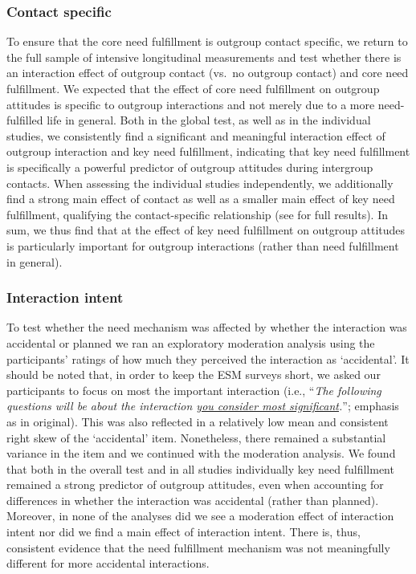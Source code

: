 \subsubsection{Contact specific}

To ensure that the core need fulfillment is outgroup contact specific,
we return to the full sample of intensive longitudinal measurements and
test whether there is an interaction effect of outgroup contact (vs.~no
outgroup contact) and core need fulfillment. We expected that the effect
of core need fulfillment on outgroup attitudes is specific to outgroup
interactions and not merely due to a more need-fulfilled life in
general. Both in the global test, as well as in the individual studies,
we consistently find a significant and meaningful interaction effect of
outgroup interaction and key need fulfillment, indicating that key need
fulfillment is specifically a powerful predictor of outgroup attitudes
during intergroup contacts. When assessing the individual studies
independently, we additionally find a strong main effect of contact as
well as a smaller main effect of key need fulfillment, qualifying the
contact-specific relationship (see  for
full results). In sum, we thus find that at the effect of key need
fulfillment on outgroup attitudes is particularly important for outgroup
interactions (rather than need fulfillment in general).

\subsubsection{Interaction intent}

To test whether the need mechanism was affected by whether the
interaction was accidental or planned we ran an exploratory moderation
analysis using the participants' ratings of how much they perceived the
interaction as `accidental'. It should be noted that, in order to keep
the ESM surveys short, we asked our participants to focus on most the
important interaction (i.e.,
``\textit{The following questions will be about the interaction \underline{you consider most significant}.}'';
emphasis as in original). This was also reflected in a relatively low
mean and consistent right skew of the `accidental' item. Nonetheless,
there remained a substantial variance in the item and we continued with
the moderation analysis. We found that both in the overall test and in
all studies individually key need fulfillment remained a strong
predictor of outgroup attitudes, even when accounting for differences in
whether the interaction was accidental (rather than planned). Moreover,
in none of the analyses did we see a moderation effect of interaction
intent nor did we find a main effect of interaction intent. There is,
thus, consistent evidence that the need fulfillment mechanism was not
meaningfully different for more accidental interactions.


